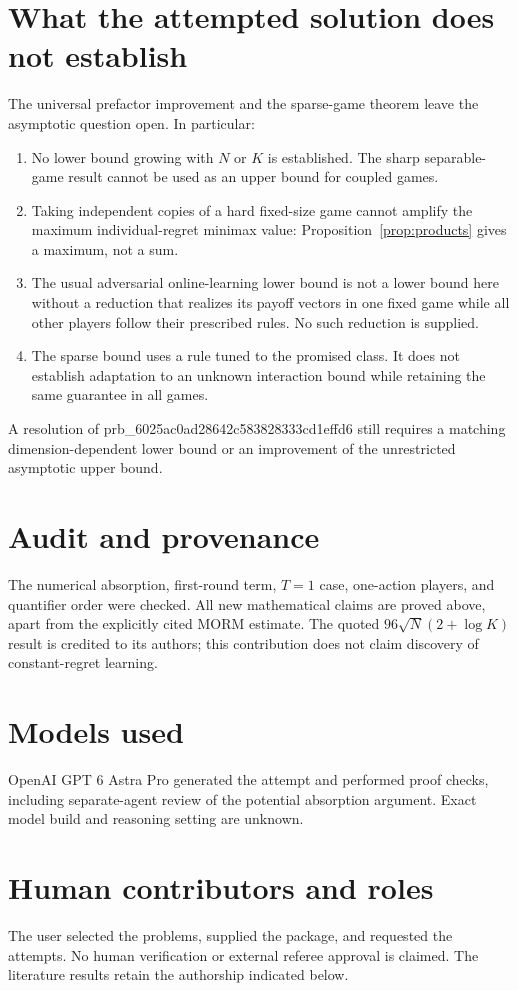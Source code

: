 \documentclass[11pt]{article}
\begin{document}
\section{What the attempted solution does not establish}
The universal prefactor improvement and the sparse-game theorem leave
the asymptotic question open. In particular:
\begin{enumerate}[leftmargin=*]
\item No lower bound growing with $N$ or $K$ is established. The sharp
separable-game result cannot be used as an upper bound for coupled games.
\item Taking independent copies of a hard fixed-size game cannot amplify
the maximum individual-regret minimax value: Proposition~\ref{prop:products}
gives a maximum, not a sum.
\item The usual adversarial online-learning lower bound is not a lower
bound here without a reduction that realizes its payoff vectors in one
fixed game while all other players follow their prescribed rules.
No such reduction is supplied.
\item The sparse bound uses a rule tuned to the promised class. It does
not establish adaptation to an unknown interaction bound while retaining
the same guarantee in all games.
\end{enumerate}
A resolution of prb_6025ac0ad28642c583828333cd1effd6 still requires a matching dimension-dependent
lower bound or an improvement of the unrestricted asymptotic upper bound.

\section*{Audit and provenance}
The numerical absorption, first-round term, $T=1$ case, one-action
players, and quantifier order were checked. All new mathematical claims
are proved above, apart from the explicitly cited MORM estimate.
The quoted $96\sqrt N(2+\log K)$ result is credited to its authors;
this contribution does not claim discovery of constant-regret learning.
\section*{Models used}
OpenAI GPT 6 Astra Pro generated the attempt and performed proof checks,
including separate-agent review of the potential absorption argument.
Exact model build and reasoning setting are unknown.

\section*{Human contributors and roles}
The user selected the problems, supplied the package, and requested the
attempts. No human verification or external referee approval is claimed.
The literature results retain the authorship indicated below.
\end{document}

